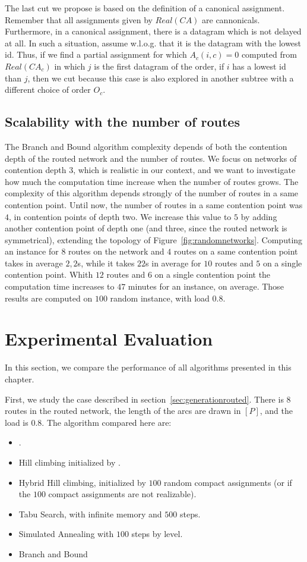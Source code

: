 The last cut we propose is based on the definition of a canonical assignment. Remember that all assignments given by $Real(CA)$ are cannonicals. Furthermore, in a canonical assignment, there is a datagram which is not delayed at all. In such a situation, assume w.l.o.g. that it is the datagram with the lowest id. Thus, if we find a partial assignment for which $A_{c}(i,c) = 0$ computed from $Real(CA_c)$ in which $j$ is the first datagram of the order, if $i$ has a lowest id than $j$, then we cut because this case is also explored in another subtree with a different choice of order $O_c$.

\subsection{Scalability with the number of routes}

The Branch and Bound algorithm complexity depends of both the contention depth of the routed network and the number of routes. We focus on networks of contention depth $3$, which is realistic in our context, and we want to investigate how much the computation time increase when the number of routes grows. The complexity of this algorithm depends strongly of the number of routes in a same contention point. Until now, the number of routes in a same contention point was $4$, in contention points of depth two. We increase this value to $5$ by adding another contention point of depth one (and three, since the routed network is symmetrical), extending the topology of Figure~\ref{fig:randomnetworks}. Computing an instance for $8$ routes on the network and $4$ routes on a same contention point takes in average $2,2$s, while it takes $22$s in average for $10$ routes and $5$ on a single contention point. Whith $12$ routes and $6$ on a single contention point the computation time increases to $47$ minutes for an instance, on average. Those results are computed on $100$ random instance, with load $0.8$.


\section{Experimental Evaluation}
\label{sec:evalperfspall}
In this section, we compare the performance of all algorithms presented in this chapter.

 First, we study the case described in section~\ref{sec:generationrouted}. There is $8$ routes in the routed network, the length of the arcs are drawn in $[P]$, and the load is $0.8$.
 The algorithm compared here are:
 \begin{itemize}
  \item \hybridgreedynormalized.
  \item Hill climbing initialized by \hgn.
  \item Hybrid Hill climbing, initialized by $100$ random compact assignments (or \hgn if the $100$ compact assignments are not realizable).
  \item Tabu Search, with infinite memory and $500$ steps.
  \item Simulated Annealing with $100$ steps by level.
  \item Branch and Bound
\end{itemize}

